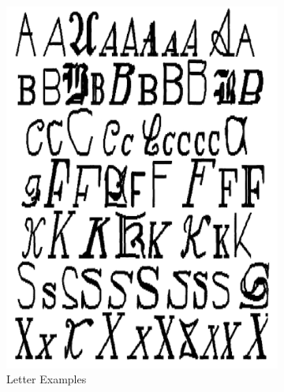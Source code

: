 \documentclass[11pt]{article}
\begin{document}
\begin{figure}[htbp]
\begin{subfigure}[htbp]{0.32\columnwidth}
\includegraphics*[width=\textwidth]{fig/ex_letter}
\caption{Letter Examples}
\label{fig:ex:letter}
\end{subfigure}
\hfill
\begin{subfigure}[htbp]{0.32\columnwidth}

\end{subfigure}
\end{figure}
\end{document}
